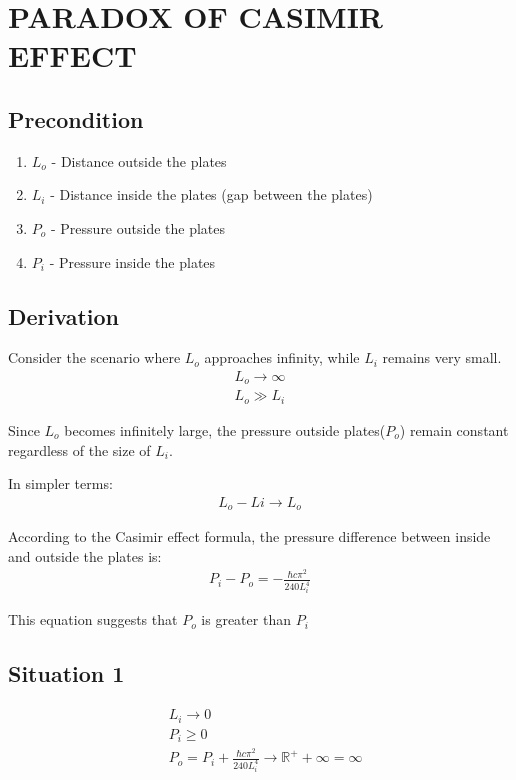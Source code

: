 \section{PARADOX OF CASIMIR EFFECT}


\subsection*{Precondition}
\begin{enumerate}
    \item \(L_o\) - Distance outside the plates
    \item \(L_i\) - Distance inside the plates (gap between the plates)
    \item \(P_o\) - Pressure outside the plates
    \item \(P_i\) - Pressure inside the plates
\end{enumerate}

\subsection*{Derivation}
Consider the scenario where  $L_o$ approaches infinity, while $L_i$ remains very small.
\begin{align}
    L_o \rightarrow \infty \\
    L_o \gg L_i
\end{align}

Since $L_o$ becomes infinitely large, the pressure outside plates($P_o$) remain constant regardless of the size of $L_i$.

\noindent In simpler terms:
\begin{align}L_o - Li \rightarrow L_o\end{align}

According to the Casimir effect formula\cite{Casimir:1948dh}, the pressure difference between inside and outside the plates is:
\begin{align}P_i - P_o = -\frac{\hbar c \pi^2}{240 L_i^4}\end{align}

This equation suggests that $P_o$ is greater than $P_i$

\subsection*{Situation 1}
\begin{align}
    &L_i \rightarrow 0 \\
    &P_i \ge 0 \\
    &P_o = P_i + \frac{\hbar c \pi^2}{240 L_i^4} \rightarrow {\mathbb{R}}^+ + \infty = \infty
\end{align}

